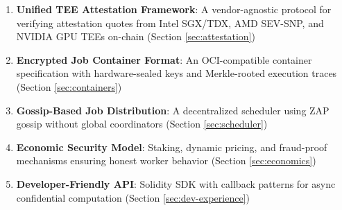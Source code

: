 \begin{enumerate}
  \item \textbf{Unified TEE Attestation Framework}: A vendor-agnostic protocol for verifying attestation quotes from Intel SGX/TDX, AMD SEV-SNP, and NVIDIA GPU TEEs on-chain (Section \ref{sec:attestation})

  \item \textbf{Encrypted Job Container Format}: An OCI-compatible container specification with hardware-sealed keys and Merkle-rooted execution traces (Section \ref{sec:containers})

  \item \textbf{Gossip-Based Job Distribution}: A decentralized scheduler using ZAP gossip without global coordinators (Section \ref{sec:scheduler})

  \item \textbf{Economic Security Model}: Staking, dynamic pricing, and fraud-proof mechanisms ensuring honest worker behavior (Section \ref{sec:economics})

  \item \textbf{Developer-Friendly API}: Solidity SDK with callback patterns for async confidential computation (Section \ref{sec:dev-experience})
\end{enumerate}

